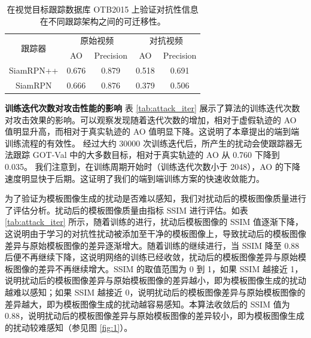 \begin{table}[t]
\caption{在视觉目标跟踪数据库 OTB2015 上验证对抗性信息在不同跟踪架构之间的可迁移性。}
\centering
\begin{tabular}{ccccc} 
\toprule
\multirow{2}{*}[-2pt]{跟踪器} & \multicolumn{2}{c}{原始视频} & \multicolumn{2}{c}{对抗视频}  \\
\cmidrule(lr){2-3} \cmidrule(lr){4-5}
                          & AO & Precision              & AO & Precision                   \\
\midrule
SiamRPN++ \cite{SiamRPN++}& 0.676   & 0.879                  & 0.518   & 0.691                       \\
SiamRPN \cite{SiamRPN}    & 0.666   & 0.876                  & 0.379   & 0.506                       \\
\bottomrule
\end{tabular}
\label{tab:arch}
\end{table}

\textbf{训练迭代次数对攻击性能的影响} 表 \ref{tab:attack_iter} 展示了算法的训练迭代次数对攻击效果的影响。可以观察发现随着迭代次数的增加，相对于虚假轨迹的 AO 值明显升高，而相对于真实轨迹的 AO 值明显下降。这说明了本章提出的端到端训练流程的有效性。
经过大约 30000 次训练迭代后，所产生的扰动会使跟踪器无法跟踪 GOT-Val 中的大多数目标，相对于真实轨迹的 AO 从 0.760 下降到 0.035。
我们注意到，在训练周期开始时（训练迭代次数小于 2048），AO 的下降速度明显快于后期。这证明了我们的端到端训练方案的快速收敛能力。

为了验证为模板图像生成的扰动是否难以感知，我们对扰动后的模板图像质量进行了评估分析。扰动后的模板图像质量由指标 SSIM 进行评估。如表 \ref{tab:attack_iter} 所示，随着训练的进行，扰动后模板图像的 SSIM 值逐渐下降，这说明由于学习的对抗性扰动被添加至干净的模板图像上，导致扰动后的模板图像差异与原始模板图像的差异逐渐增大。随着训练的继续进行，当 SSIM 降至 0.88 后便不再继续下降，这说明网络的训练已经收敛，扰动后的模板图像差异与原始模板图像的差异不再继续增大。SSIM 的取值范围为 0 到 1，如果 SSIM 越接近 1，说明扰动后的模板图像差异与原始模板图像的差异越小，即为模板图像生成的扰动越难以感知；如果 SSIM 越接近 0，说明扰动后的模板图像差异与原始模板图像的差异越大，即为模板图像生成的扰动越容易感知。本算法收敛后的 SSIM 值为 0.88，说明扰动后的模板图像差异与原始模板图像的差异较小，即为模板图像生成的扰动较难感知（参见图 \ref{fig:1}）。

